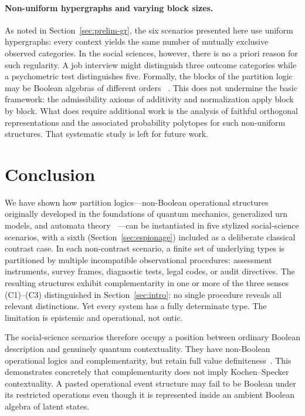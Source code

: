 \documentclass{article}
\begin{document}
\paragraph{Non-uniform hypergraphs and varying block sizes.}
As noted in Section~\ref{sec:prelim-gr}, the six scenarios presented
here use uniform hypergraphs: every context yields the same number of
mutually exclusive observed categories. In the social sciences,
however, there is no a priori reason for such regularity. A job
interview might distinguish three outcome categories while a
psychometric test distinguishes five. Formally, the blocks of the
partition logic may be Boolean algebras of different orders
~\cite{greechie:71}. This does not undermine the basic framework:
the admissibility axioms of additivity and normalization apply block
by block. What does require additional work is the analysis of
faithful orthogonal representations and the associated probability
polytopes for such non-uniform structures. That systematic study is
left for future work.

\section{Conclusion}
\label{sec:conclusion}

We have shown how partition logics---non-Boolean operational
structures originally developed in the foundations of quantum
mechanics, generalized urn models, and automata theory
~\cite{svozil-2001-eua}---can be instantiated in five stylized
social-science scenarios, with a sixth (Section~\ref{sec:espionage})
included as a deliberate classical contrast case. In each
non-contrast scenario, a finite set of underlying types is
partitioned by multiple incompatible observational procedures:
assessment instruments, survey frames, diagnostic tests, legal
codes, or audit directives. The resulting structures exhibit
complementarity in one or more of the three senses (C1)--(C3)
distinguished in Section~\ref{sec:intro}: no single procedure
reveals all relevant distinctions. Yet every system has a fully
determinate type. The limitation is epistemic and operational, not
ontic.

The social-science scenarios therefore occupy a position between
ordinary Boolean description and genuinely quantum contextuality.
They have non-Boolean operational logics and complementarity, but
retain full value definiteness~\cite{svozil-2018-b}. This
demonstrates concretely that complementarity does not imply
Kochen--Specker contextuality. A pasted operational event structure
may fail to be Boolean under its restricted operations even though it
is represented inside an ambient Boolean algebra of latent states.
\end{document}
